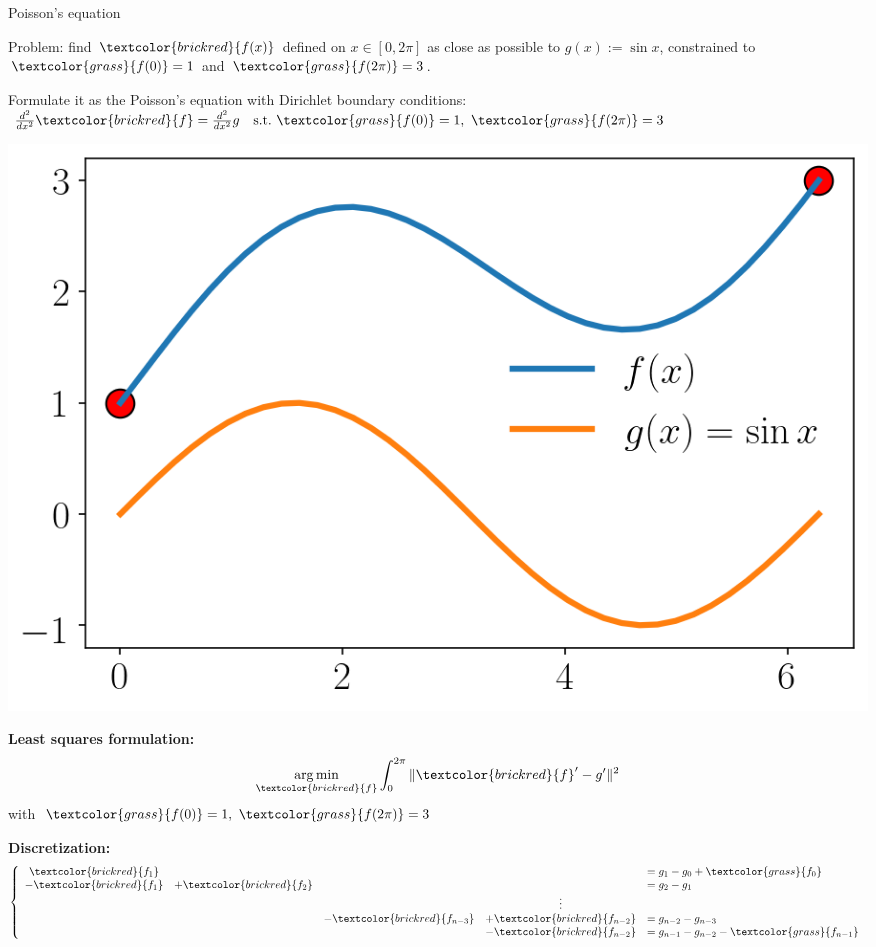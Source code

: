 \documentclass[UKenglish,aspectratio=169]{beamer}
\DeclareMathOperator*{\argmin}{arg\,min}
\newcommand\unknown[1]{\textcolor{brickred}{#1}}
\newcommand\known[1]{\textcolor{grass}{#1}}
\begin{document}
\begin{frame}{Poisson's equation}
\begin{minipage}{.45\linewidth}
Problem: find $\unknown{f(x)}$ defined on $x\in[0,2\pi]$ as close as possible to $g(x):=\sin x$, constrained to $\known{f(0)}=1$ and $\known{f(2\pi)} = 3$.

\vspace{5pt}
Formulate it as the Poisson's equation with Dirichlet boundary conditions:\\
$
\frac{d^2}{dx^2}\unknown{f}  = \frac{d^2}{dx^2} g \quad \text{s.t.~} \known{f(0)}=1,~\known{f(2\pi)} = 3
$
\end{minipage}
\qquad
\begin{minipage}{.4\linewidth}
\centerline{\includegraphics[width=\linewidth]{../manuscript/img/pie-1d.png}}
\end{minipage}
\pause
\begin{minipage}[t]{.35\linewidth}
\strut\vspace*{-\baselineskip}\newline
\textbf{Least squares formulation:}
$$
\argmin\limits_{\unknown{f}} \int_0^{2\pi} \|\unknown{f}' - g'\|^2
$$
with $\known{f(0)}=1,~\known{f(2\pi)} = 3$
\end{minipage}
\pause
\qquad
\begin{minipage}[t]{.55\linewidth}
\strut\vspace*{-\baselineskip}\newline
\textbf{Discretization:}
$$
\left \{ \begin{array}{ccccl}
\unknown{f_1} &       &       &           & =  g_1 - g_0 + \known{f_0}  \\
-\unknown{f_1} & + \unknown{f_2} &       &           & = g_2 - g_1 \\
    &       &       & \vdots    &             \\
     &        &  -\unknown{f_{n-3}}     &  +\unknown{f_{n-2}}          & = g_{n-2} - g_{n-3} \\
     &        &       & - \unknown{f_{n-2}} & =  g_{n-1}-g_{n-2} -\known{f_{n-1}}
\end{array} \right.
$$
\end{minipage}
\end{frame}
\end{document}
